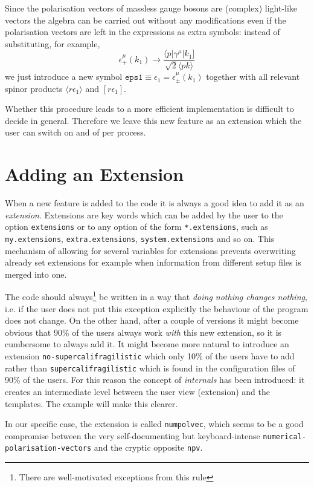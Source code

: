 \documentclass[11pt,a4paper]{refrep}
\begin{document}
Since the polarisation vectors of massless gauge bosons are (complex)
light-like vectors the algebra can be carried out without any modifications
even if the polarisation vectors are left in the expressions as extra symbols:
instead of substituting, for example,
\begin{equation}
\epsilon^\mu_+(k_1)\to\frac{\langle p\vert\gamma^\mu\vert k_1]}%
{\sqrt{2}\langle pk\rangle}
\end{equation}
we just introduce a new symbol
$\mathtt{eps1}\equiv\epsilon_1=\epsilon^\mu_\pm(k_1)$
together with all relevant spinor products $\langle r\epsilon_1\rangle$
and $[r\epsilon_1]$.

Whether this procedure leads to a more efficient implementation is difficult
to decide in general. Therefore we leave this new feature as an extension
which the user can switch on and of per process.

\section{Adding an Extension}
When a new feature is added to the code it is always a good idea to add it
as an \emph{extension}. Extensions are key words which can be added by
the user to the option \texttt{extensions} or to any option of the
form \texttt{*.extensions}, such as \texttt{my.extensions},
\texttt{extra.extensions}, \texttt{system.extensions} and so on.
This mechanism of allowing for
several variables for extensions prevents overwriting already set extensions
for example when information from different setup files is merged into one.

The code should always\footnote{There are well-motivated exceptions from
this rule} be written in a way that \emph{doing nothing changes nothing},
i.e. if the user does not put this exception explicitly the behaviour of
the program does not change. On the other hand, after a couple of versions
it might become obvious that 90\% of the users always work \emph{with}
this new extension, so it is cumbersome to always add it. It might become
more natural to introduce an extension \texttt{no-supercalifragilistic}
which only 10\% of the users have to add
rather than \texttt{supercalifragilistic} which is found in the configuration
files of 90\% of the users. For this reason the concept
of \emph{internals} has been introduced: it creates an intermediate level
between the user view (extension) and the templates. The example will
make this clearer.

In our specific case, the extension is called \texttt{numpolvec},
which seems to be a good compromise between the very self-documenting
but keyboard-intense \texttt{numerical-polarisation-vectors} and the
cryptic opposite \texttt{npv}.
\end{document}
